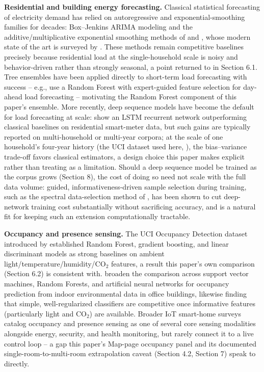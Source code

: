 \documentclass[11pt,a4paper]{article}
\begin{document}
\textbf{Residential and building energy forecasting.} Classical statistical forecasting of electricity demand has relied on autoregressive and exponential-smoothing families for decades: Box--Jenkins ARIMA modeling \citep{box1970} and the additive/multiplicative exponential smoothing methods of \citet{holt2004} and \citet{winters1960}, whose modern state of the art is surveyed by \citet{gardner2006}. These methods remain competitive baselines precisely because residential load at the single-household scale is noisy and behavior-driven rather than strongly seasonal, a point returned to in Section 6.1. Tree ensembles have been applied directly to short-term load forecasting with success -- e.g., \citet{lahouar2015} use a Random Forest with expert-guided feature selection for day-ahead load forecasting -- motivating the Random Forest component of this paper's ensemble. More recently, deep sequence models have become the default for load forecasting at scale: \citet{kong2019} show an LSTM recurrent network outperforming classical baselines on residential smart-meter data, but such gains are typically reported on multi-household or multi-year corpora; at the scale of one household's four-year history (the UCI dataset used here, \citealp{hebrail2012}), the bias--variance trade-off favors classical estimators, a design choice this paper makes explicit rather than treating as a limitation. Should a deep sequence model be trained as the corpus grows (Section 8), the cost of doing so need not scale with the full data volume: guided, informativeness-driven sample selection during training, such as the spectral data-selection method of \citet{sharifi2026}, has been shown to cut deep-network training cost substantially without sacrificing accuracy, and is a natural fit for keeping such an extension computationally tractable.

\textbf{Occupancy and presence sensing.} The UCI Occupancy Detection dataset introduced by \citet{candanedo2016} established Random Forest, gradient boosting, and linear discriminant models as strong baselines on ambient light/temperature/humidity/CO$_2$ features, a result this paper's own comparison (Section 6.2) is consistent with. \citet{ryu2016} broaden the comparison across support vector machines, Random Forests, and artificial neural networks for occupancy prediction from indoor environmental data in office buildings, likewise finding that simple, well-regularized classifiers are competitive once informative features (particularly light and CO$_2$) are available. Broader IoT smart-home surveys \citep{alaa2017} catalog occupancy and presence sensing as one of several core sensing modalities alongside energy, security, and health monitoring, but rarely connect it to a live control loop -- a gap this paper's Map-page occupancy panel and its documented single-room-to-multi-room extrapolation caveat (Section 4.2, Section 7) speak to directly.
\end{document}
